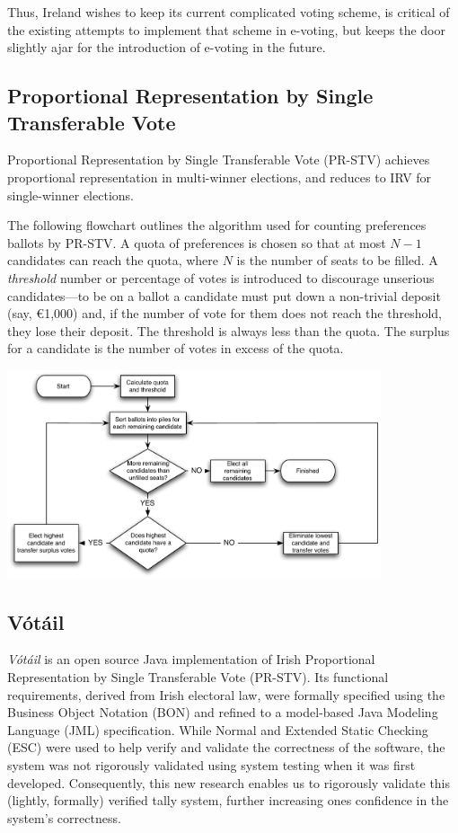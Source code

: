 \documentclass[runningheads,a4paper]{llncs}
\newcommand{\votail}{V\'{o}t\'{a}il\xspace}
\begin{document}
Thus, Ireland wishes to keep its current complicated voting scheme, is
critical of the existing attempts to implement that scheme in
e-voting, but keeps the door slightly ajar for the introduction of
e-voting in the future.

\subsection{Proportional Representation by Single Transferable Vote}

Proportional Representation by Single Transferable Vote (PR-STV)
achieves proportional representation in multi-winner elections, and
reduces to IRV for single-winner elections.

The following flowchart outlines the algorithm used for counting
preferences ballots by PR-STV.  A quota of preferences is chosen so
that at most $N-1$ candidates can reach the quota, where $N$ is the
number of seats to be filled.  A \emph{threshold} number or percentage
of votes is introduced to discourage unserious candidates---to be on a
ballot a candidate must put down a non-trivial deposit (say,
\euro1,000) and, if the number of vote for them does not reach the
threshold, they lose their deposit.  The threshold is always less than
the quota.  The surplus for a candidate is the number of votes in
excess of the quota.

\begin{center}
\includegraphics[width=110mm]{Process.pdf}
\end{center}

\subsection{\votail}

\emph{\votail} is an open source Java implementation of Irish
Proportional Representation by Single Transferable Vote (PR-STV). Its
functional requirements, derived from Irish electoral law, were
formally specified using the Business Object Notation (BON) and
refined to a model-based Java Modeling Language (JML) specification.
While Normal and Extended Static Checking (ESC) were used to help
verify and validate the correctness of the software, the system was
not rigorously validated using system testing when it was first
developed.  Consequently, this new research enables us to rigorously
validate this (lightly, formally) verified tally system, further
increasing ones confidence in the system's correctness.
\end{document}
